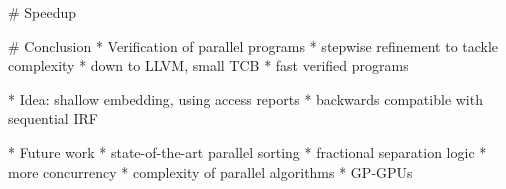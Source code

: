 \documentclass[fleqn]{beamer}
\newcommand{\high}[1]{{\color{blue}#1}}
\begin{document}
# Speedup

{

# Conclusion
  * Verification of parallel programs
    * stepwise refinement to tackle complexity
    * down to LLVM, small TCB
    * \high{fast} verified programs

  * Idea: shallow embedding, using access reports
    * backwards compatible with sequential IRF

  * Future work
    * state-of-the-art parallel sorting
    * fractional separation logic
    * more concurrency
    * complexity of parallel algorithms
    * GP-GPUs

}
\end{document}

